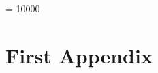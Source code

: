 \documentclass[11pt,a4paper,german,notitlepage]{report}
\begin{document}
  \displaywidowpenalty = 10000




\setcounter{page}{1}

\pagestyle{fancy}




























\renewcommand{\appendixpagename}{Appendix}

\newpage

{}
\appendix
\appendixpage


\chapter{First Appendix}
\label{chap:appendix_A}
\end{document}
